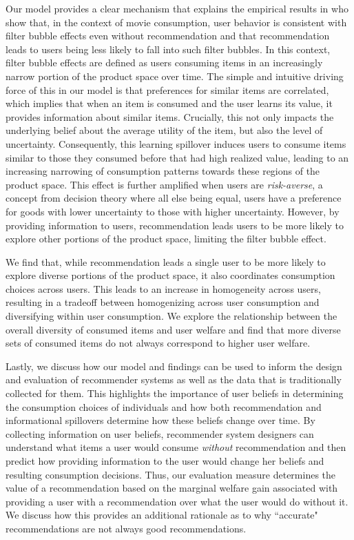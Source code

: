 \documentclass[format=acmsmall, review=false]{acmart}
\newcommand{\xhdr}[1]{\vspace{1mm} \noindent{\bf #1}}
\begin{document}
\xhdr{Our Contributions}
Our model provides a clear mechanism that explains the empirical results in \cite{nguyen2014exploring} who show that, in the context of movie consumption, user behavior is consistent with filter bubble effects even without recommendation and that recommendation leads to users being less likely to fall into such filter bubbles. In this context, filter bubble effects are defined as users consuming items in an increasingly narrow portion of the product space over time. The simple and intuitive driving force of this in our model is that preferences for similar items are correlated, which implies that when an item is consumed and the user learns its value, it provides information about similar items. Crucially, this not only impacts the underlying belief about the average utility of the item, but also the level of uncertainty. Consequently, this learning spillover induces users to consume items similar to those they consumed before that had high realized value, leading to an increasing narrowing of consumption patterns towards these regions of the product space. This effect is further amplified when users are \textit{risk-averse}, a concept from decision theory where all else being equal, users have a preference for goods with lower uncertainty to those with higher uncertainty. However, by providing information to users, recommendation leads users to be more likely to explore other portions of the product space, limiting the filter bubble effect.
\par
We find that, while recommendation leads a single user to be more likely to explore diverse portions of the product space, it also coordinates consumption choices across users. This leads to an increase in homogeneity across users, resulting in a tradeoff between homogenizing across user consumption and diversifying within user consumption. We explore the relationship between the overall diversity of consumed items and user welfare and find that more diverse sets of consumed items do not always correspond to higher user welfare. 
\par
Lastly, we discuss how our model and findings can be used to inform the design and evaluation of recommender systems as well as the data that is traditionally collected for them. This highlights the importance of user beliefs in determining the consumption choices of individuals and how both recommendation and informational spillovers determine how these beliefs change over time. By collecting information on user beliefs, recommender system designers can understand what items a user would consume \textit{without} recommendation and then predict how providing information to the user would change her beliefs and resulting consumption decisions. Thus,  our evaluation measure determines the value of a recommendation based on the marginal welfare gain associated with providing a user with a recommendation over what the user would do without it. We discuss how this provides an additional rationale as to why ``accurate" recommendations are not always good recommendations.
\end{document}
